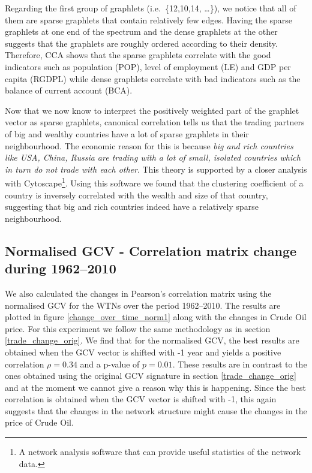 Regarding the first group of graphlets (i.e.\ \{12,10,14, \dots \}), we notice that all of them are sparse graphlets that contain relatively few edges. Having the sparse graphlets at one end of the spectrum and the dense graphlets at the other suggests that the graphlets are roughly ordered according to their density. Therefore, CCA shows that the sparse graphlets correlate with the good indicators such as population (POP), level of employment (LE) and GDP per capita (RGDPL) while dense graphlets correlate with bad indicators such as the balance of current account (BCA).

Now that we now know to interpret the positively weighted part of the graphlet vector as sparse graphlets, canonical correlation tells us that the trading partners of big and wealthy countries have a lot of sparse graphlets in their neighbourhood. The economic reason for this is because \emph{big and rich countries like USA, China, Russia are trading with a lot of small, isolated countries which in turn do not trade with each other}. This theory is supported by a closer analysis with Cytoscape\footnote{A network analysis software that can provide useful statistics of the network data.}. Using this software we found that the clustering coefficient of a country is inversely correlated with the wealth and size of that country, suggesting that big and rich countries indeed have a relatively sparse neighbourhood.


\subsection{Normalised GCV - Correlation matrix change during 1962--2010}
\label{rev_trade_change}


We also calculated the changes in Pearson's correlation matrix using the normalised GCV for the WTNs over the period 1962--2010. The results are plotted in figure \ref{change_over_time_norm1} along with the changes in Crude Oil price. For this experiment we follow the same methodology as in section \ref{trade_change_orig}. We find that for the normalised GCV, the best results are obtained when the GCV vector is shifted with -1 year and yields a positive correlation $\rho = 0.34$ and a p-value of $p = 0.01$. These results are in contrast to the ones obtained using the original GCV signature in section \ref{trade_change_orig} and at the moment we cannot give a reason why this is happening. Since the best correlation is obtained when the GCV vector is shifted with -1, this again suggests that the changes in the network structure might cause the changes in the price of Crude Oil.

